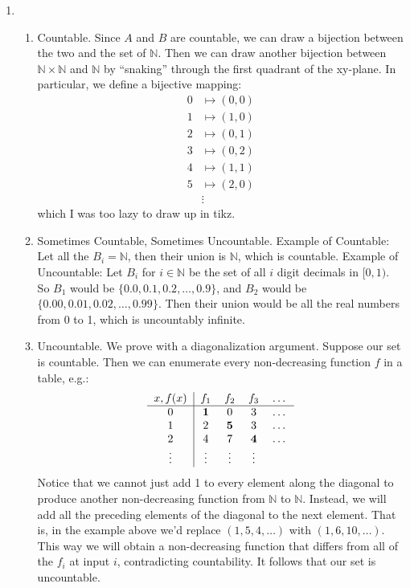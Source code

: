 \begin{enumerate}
    \item \begin{enumerate} 
        \item Countable. Since $A$ and $B$ are countable, we can draw a bijection between the two and the set of $\mathbb{N}$. Then we can draw another bijection between $\mathbb{N} \times \mathbb{N}$ and $\mathbb{N}$ by ``snaking'' through the first quadrant of the xy-plane. In particular, we define a bijective mapping:
        \begin{align*}
            0 &\mapsto (0,0) \\
            1 &\mapsto (1,0) \\
            2 &\mapsto (0,1) \\
            3 &\mapsto (0,2) \\
            4 &\mapsto (1,1) \\
            5 &\mapsto (2,0) \\
            &\vdots
        \end{align*}
        which I was too lazy to draw up in tikz.
        
        \item Sometimes Countable, Sometimes Uncountable. Example of Countable: Let all the $B_i = \mathbb{N}$, then their union is $\mathbb{N}$, which is countable. Example of Uncountable: Let $B_i$ for $i \in \mathbb{N}$ be the set of all $i$ digit decimals in $[0,1)$. So $B_1$ would be $\{0.0, 0.1, 0.2, \ldots, 0.9\}$, and $B_2$ would be $\{0.00, 0.01, 0.02, \ldots, 0.99\}$. Then their union would be all the real numbers from 0 to 1, which is uncountably infinite.
        
        \item Uncountable. We prove with a diagonalization argument. Suppose our set is countable. Then we can enumerate every non-decreasing function $f$ in a table, e.g.:
        \[
        \begin{tabular}{c|cccc}
            $x,f(x)$ & $f_1$ & $f_2$ & $f_3$ & \ldots \\
            \hline
            0 & \bf{1} & 0 & 3 & \ldots \\
            1 & 2 & \bf{5} & 3 & \ldots \\
            2 & 4 & 7 & \bf{4} & \ldots \\
            \vdots & \vdots & \vdots & \vdots
        \end{tabular}
        \]
        Notice that we cannot just add 1 to every element along the diagonal to produce another non-decreasing function from $\mathbb{N}$ to $\mathbb{N}$. Instead, we will add all the preceding elements of the diagonal to the next element. That is, in the example above we'd replace $(1, 5, 4, \ldots)$ with $(1, 6, 10, \ldots)$. This way we will obtain a non-decreasing function that differs from all of the $f_i$ at input $i$, contradicting countability. It follows that our set is uncountable.
        

\end{enumerate}
\end{enumerate}
